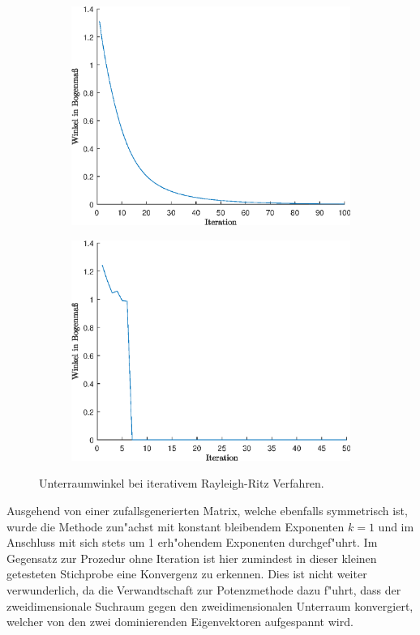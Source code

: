 \begin{figure}[h!]
\center
\begin{subfigure}[c]{.4\textwidth}
\includegraphics[width=.9\linewidth]{images/iterRRDistConstant}
\end{subfigure}
\begin{subfigure}[c]{.4\textwidth}
\includegraphics[width=.9\linewidth]{images/iterRRDistIncreasing}
\end{subfigure}
\caption{Unterraumwinkel bei iterativem Rayleigh-Ritz Verfahren.}\label{chap1:im:catinterval}
\end{figure}

\newpage

Ausgehend von einer zufallsgenerierten Matrix, welche ebenfalls symmetrisch ist, wurde die Methode zun"achst mit konstant bleibendem Exponenten $k=1$ und im Anschluss mit sich stets um 1 erh"ohendem Exponenten durchgef"uhrt. Im Gegensatz zur Prozedur ohne Iteration ist hier zumindest in dieser kleinen getesteten Stichprobe eine Konvergenz zu erkennen. Dies ist nicht weiter verwunderlich, da die Verwandtschaft zur Potenzmethode dazu f"uhrt, dass der zweidimensionale Suchraum gegen den zweidimensionalen Unterraum konvergiert, welcher von den zwei dominierenden Eigenvektoren aufgespannt wird.\\

